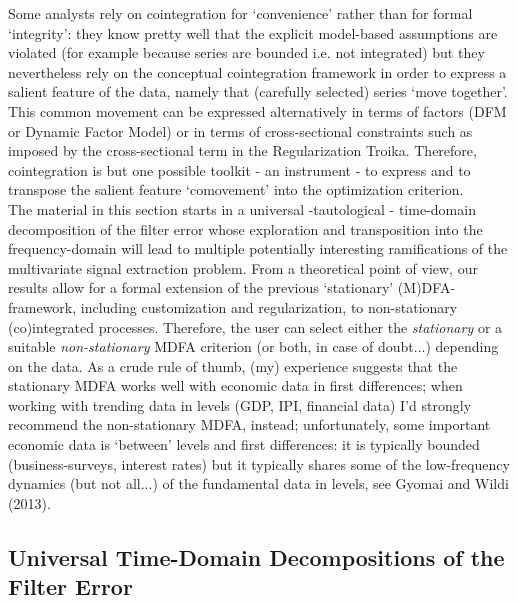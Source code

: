 \documentclass[11pt]{article}
\begin{document}
Some analysts rely on cointegration for `convenience' rather than for formal `integrity': they know pretty well that the explicit model-based assumptions are violated (for example because series are bounded i.e. not integrated) but they nevertheless rely on the conceptual cointegration framework  in order to express a salient feature of the data, namely that (carefully selected) series `move together'. This common movement can be expressed alternatively in terms of factors (DFM or Dynamic Factor Model) or in terms of cross-sectional constraints such as imposed by the cross-sectional term in the Regularization Troika. Therefore, cointegration is but one possible toolkit - an instrument - to express and to transpose the salient feature `comovement' into the optimization criterion. \\
The material in this section starts in a universal -tautological - time-domain decomposition of the filter error whose exploration and transposition into the frequency-domain will lead to multiple potentially interesting ramifications of the multivariate signal extraction problem. From a theoretical point of view, our results allow for a formal extension of the previous `stationary' (M)DFA-framework, including customization and regularization, to non-stationary (co)integrated processes. Therefore, the user can select either the \emph{stationary } or a suitable \emph{non-stationary} MDFA criterion (or both, in case of doubt...) depending on the data. As a crude rule of thumb, (my) experience suggests that the stationary MDFA works well with economic data in first differences; when working with trending data in levels (GDP, IPI, financial data) I'd strongly recommend the non-stationary MDFA, instead; unfortunately, some important economic data is `between' levels and first differences: it is typically bounded (business-surveys, interest rates) but it typically shares some of the low-frequency dynamics (but not all...) of the fundamental data in levels, see Gyomai and Wildi (2013).


\subsection{Universal Time-Domain Decompositions of the Filter Error}\label{taut_time-d}
\end{document}
